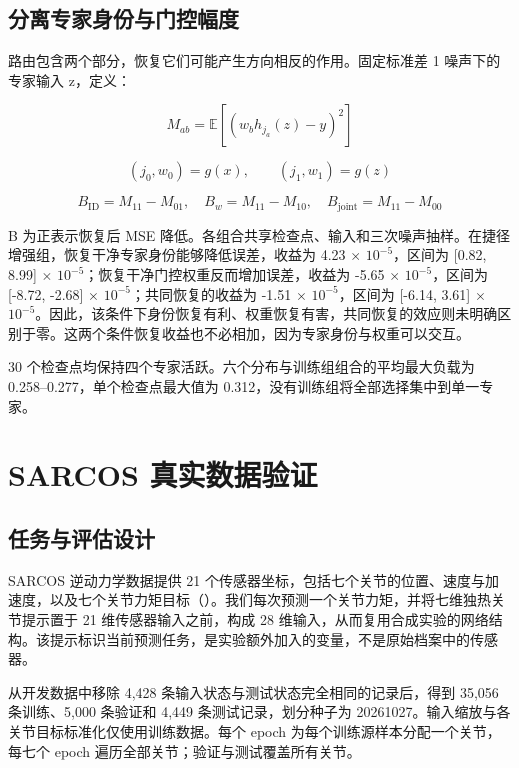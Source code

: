 \documentclass[10pt,letterpaper]{article}
\begin{document}
\subsection{分离专家身份与门控幅度}

路由包含两个部分，恢复它们可能产生方向相反的作用。固定标准差 1 噪声下的专家输入 z，定义：


\[
M_{ab}=\mathbb{E}[(w_b h_{j_a}(z)-y)^2]
\]

\[
(j_0,w_0)=g(x),\qquad(j_1,w_1)=g(z)
\]

\[
B_{\mathrm{ID}}=M_{11}-M_{01},\quad B_w=M_{11}-M_{10},\quad B_{\mathrm{joint}}=M_{11}-M_{00}
\]

B 为正表示恢复后 MSE 降低。各组合共享检查点、输入和三次噪声抽样。在捷径增强组，恢复干净专家身份能够降低误差，收益为 4.23 \ensuremath{\times} $10^{-5}$，区间为 [0.82, 8.99] \ensuremath{\times} $10^{-5}$；恢复干净门控权重反而增加误差，收益为 -5.65 \ensuremath{\times} $10^{-5}$，区间为 [-8.72, -2.68] \ensuremath{\times} $10^{-5}$；共同恢复的收益为 -1.51 \ensuremath{\times} $10^{-5}$，区间为 [-6.14, 3.61] \ensuremath{\times} $10^{-5}$。因此，该条件下身份恢复有利、权重恢复有害，共同恢复的效应则未明确区别于零。这两个条件恢复收益也不必相加，因为专家身份与权重可以交互。


30 个检查点均保持四个专家活跃。六个分布与训练组组合的平均最大负载为 0.258--0.277，单个检查点最大值为 0.312，没有训练组将全部选择集中到单一专家。


\FloatBarrier

\section{SARCOS 真实数据验证}

\subsection{任务与评估设计}

SARCOS 逆动力学数据提供 21 个传感器坐标，包括七个关节的位置、速度与加速度，以及七个关节力矩目标（\citealp{vijayakumar2005}）。我们每次预测一个关节力矩，并将七维独热关节提示置于 21 维传感器输入之前，构成 28 维输入，从而复用合成实验的网络结构。该提示标识当前预测任务，是实验额外加入的变量，不是原始档案中的传感器。


从开发数据中移除 4,428 条输入状态与测试状态完全相同的记录后，得到 35,056 条训练、5,000 条验证和 4,449 条测试记录，划分种子为 20261027。输入缩放与各关节目标标准化仅使用训练数据。每个 epoch 为每个训练源样本分配一个关节，每七个 epoch 遍历全部关节；验证与测试覆盖所有关节。
\end{document}
